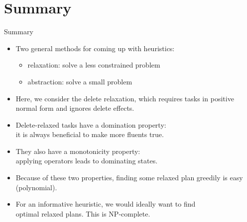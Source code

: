 \documentclass{gkibeamer}
\begin{document}
\section*{Summary}

\begin{frame}{Summary}
  \begin{itemize}
  \item Two general methods for coming up with heuristics:
    \begin{itemize}
    \item \alert{relaxation}: solve a \alert{less constrained}
      problem
    \item \alert{abstraction}: solve a \alert{small} problem
    \end{itemize}
  \item Here, we consider the \alert{delete relaxation}, which
    requires tasks in positive normal form and ignores delete
    effects.
  \item Delete-relaxed tasks have a \alert{domination} property: \\
    it is always beneficial to make more fluents true.
  \item They also have a \alert{monotonicity} property: \\
    applying operators leads to dominating states.
  \item Because of these two properties, \alert{finding some relaxed
    plan} greedily is \alert{easy} (polynomial).
  \item For an informative heuristic, we would ideally want to find \\
    \alert{optimal relaxed plans}. This is \alert{NP-complete}.
  \end{itemize}
\end{frame}
\end{document}
